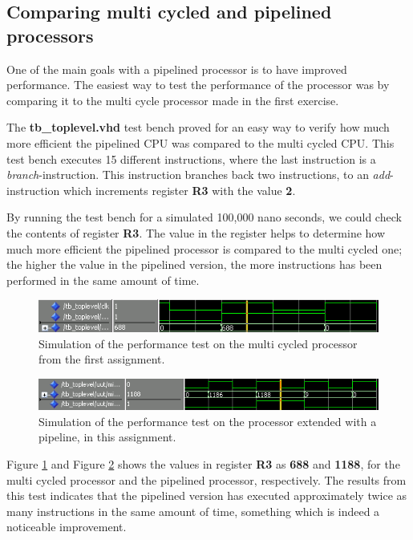 \subsection{Comparing multi cycled and pipelined processors}
One of the main goals with a pipelined processor is to have improved
performance. The easiest way to test the performance of the processor
was by comparing it to the multi cycle processor made in the first
exercise.

The \textbf{tb\_toplevel.vhd} test bench proved for an easy way to verify
how much more efficient the pipelined CPU was compared to the multi 
cycled CPU. This test bench executes 15 different instructions, where
the last instruction is a \textit{branch}-instruction. This 
instruction branches back two instructions, to an 
\textit{add}-instruction which increments register 
\textbf{R3} with the value \textbf{2}.

By running the test bench for a simulated 100,000 nano seconds, we could 
check the contents of register \textbf{R3}. The value in the register
helps to determine how much more
efficient the pipelined processor is compared to the multi cycled one; the
higher the value in the pipelined version, the more instructions has been
performed in the same amount of time. 

\begin{figure}[ht]
    \centering
        \includegraphics[width=1\textwidth]{figures/multi-cycle-improvement}
    \caption{Simulation of the performance test on the multi cycled processor
    from the first assignment.}
    \label{multi-cycle-improvement}
\end{figure}

\begin{figure}[ht]
    \centering
        \includegraphics[width=1\textwidth]{figures/pipeline-improvement}
    \caption{Simulation of the performance test on the processor 
    extended with a pipeline, in this assignment.}
    \label{pipeline-improvement}
\end{figure}

Figure \ref{multi-cycle-improvement} and Figure \ref{pipeline-improvement} 
shows the values in register \textbf{R3} as \textbf{688} and \textbf{1188},
for the multi cycled processor and the pipelined processor, respectively.
The results from this test indicates that the pipelined version has 
executed approximately twice as many instructions in the same amount of time,
something which is indeed a noticeable improvement.